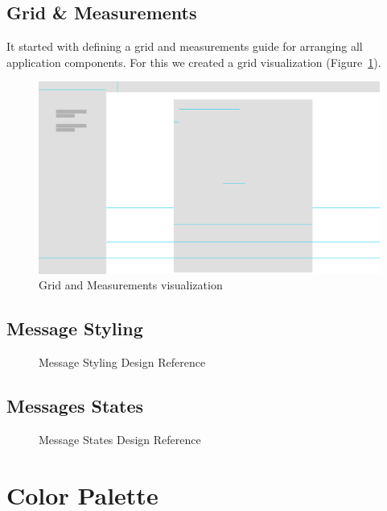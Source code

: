\subsection{Grid \& Measurements}\label{subsec:grid-and-measurements}

It started with defining a grid and measurements guide for arranging all application components. For this we created a
grid visualization (Figure~\ref{fig:grid}).

\begin{figure}[!ht]
    \centering
    \includegraphics[width=1.0\textwidth]{./images/grid.pdf}
    \caption{Grid and Measurements visualization}
    \label{fig:grid}
\end{figure}

\subsection{Message Styling}\label{subsec:message-styling}

\begin{figure}[ht]
    \caption{Message Styling Design Reference}
    \centering\def\svgwidth{15cm}\label{fig:figure2}
\end{figure}


\subsection{Messages States}\label{subsec:messages-states}
\begin{figure}[ht]
    \caption{Message States Design Reference}
    \centering\def\svgwidth{15cm}\label{fig:figure3}
\end{figure}

\section{Color Palette}\label{sec:color-palette}

